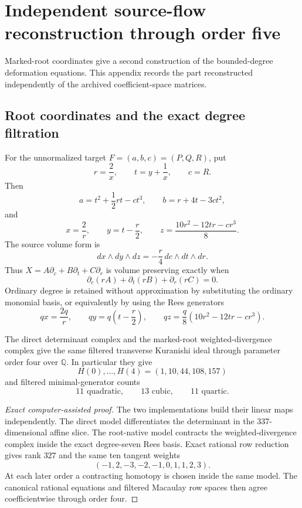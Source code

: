 \section{Independent source-flow reconstruction through order five}
\label{app:source-flow-reconstruction-progress}

Marked-root coordinates give a second construction of the bounded-degree
deformation equations.  This appendix records the part reconstructed
independently of the archived coefficient-space matrices.

\subsection{Root coordinates and the exact degree filtration}

For the unnormalized target \(F=(a,b,c)=(P,Q,R)\), put
\[
r=\frac2x,\qquad t=y+\frac1x,\qquad c=R.
\]
Then
\[
a=t^2+\frac12rt-ct^3,\qquad
b=r+4t-3ct^2,
\]
and
\[
x=\frac2r,\qquad y=t-\frac r2,\qquad
z=\frac{10r^2-12tr-cr^3}{8}.
\]
The source volume form is
\[
dx\wedge dy\wedge dz=-\frac r4\,dc\wedge dt\wedge dr.
\]
Thus \(X=A\partial_c+B\partial_t+C\partial_r\) is volume preserving exactly
when
\[
\partial_c(rA)+\partial_t(rB)+\partial_r(rC)=0.
\]
Ordinary degree is retained without approximation by substituting the
ordinary monomial basis, or equivalently by using the Rees generators
\[
qx=\frac{2q}{r},\qquad
qy=q\left(t-\frac r2\right),\qquad
qz=\frac q8(10r^2-12tr-cr^3).
\]

\begin{theorem}
\label{thm:source-flow-reconstruction}
The direct determinant complex and the marked-root weighted-divergence
complex give the same filtered transverse Kuranishi ideal through parameter
order four over \(\mathbb Q\).  In particular they give
\[
H(0),\ldots,H(4)=(1,10,44,108,157)
\]
and filtered minimal-generator counts
\[
11\text{ quadratic},\qquad
13\text{ cubic},\qquad
11\text{ quartic}.
\]
\end{theorem}

\begin{proof}[Exact computer-assisted proof]
The two implementations build their linear maps independently.  The direct
model differentiates the determinant in the 337-dimensional affine slice.
The root-native model contracts the weighted-divergence complex inside the
exact degree-seven Rees basis.  Exact rational row reduction gives rank
\(327\) and the same ten tangent weights
\[
(-1,2,-3,-2,-1,0,1,1,2,3).
\]
At each later order a contracting homotopy is chosen inside the same model.
The canonical rational equations and filtered Macaulay row spaces then agree
coefficientwise through order four.
\end{proof}

